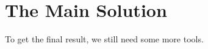 \section{The Main Solution}

      \begin{frame}
            To get the final result, we still need some more tools.
      \end{frame}

      

      

      

      

      
